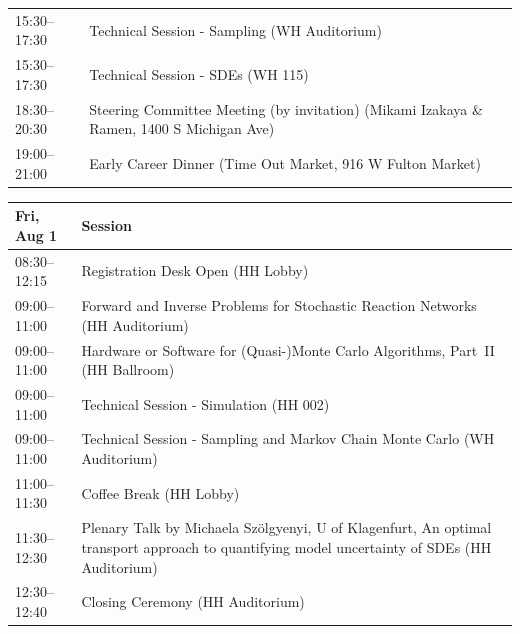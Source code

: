 \begin{table}
{\begin{tabularx}{\textwidth}{>{\hsize=0.32\hsize}X|>{\hsize=1.7\hsize}X}
\cellcolor{\SessionLightColor}15:30--17:30 & \cellcolor{\SessionLightColor}Technical Session - Sampling (WH Auditorium) \\
\cellcolor{\SessionLightColor}15:30--17:30 & \cellcolor{\SessionLightColor}Technical Session - SDEs (WH 115) \\
\cellcolor{\SessionTitleColor}18:30--20:30 & \cellcolor{\SessionTitleColor}Steering Committee Meeting (by invitation) (Mikami Izakaya \& Ramen, 1400 S Michigan Ave) \\
\cellcolor{\EmptyColor}19:00--21:00 & \cellcolor{\EmptyColor}Early Career Dinner (Time Out Market, 916 W Fulton Market) \\
\hline
\end{tabularx}
}
\end{table}

\begin{table}
{\footnotesize
\begin{tabularx}{\textwidth}{>{\hsize=0.32\hsize}X|>{\hsize=1.7\hsize}X}
\hline
\textbf{Fri, Aug 1} & \textbf{Session} \\
\hline
\cellcolor{\EmptyColor}08:30--12:15 & \cellcolor{\EmptyColor}Registration Desk Open (HH Lobby) \\
\cellcolor{\SessionTitleColor}09:00--11:00 & \cellcolor{\SessionTitleColor}Forward and Inverse Problems for Stochastic Reaction Networks (HH Auditorium) \\
\cellcolor{\SessionTitleColor}09:00--11:00 & \cellcolor{\SessionTitleColor}Hardware or Software for (Quasi-)Monte Carlo Algorithms, Part~II (HH Ballroom) \\
\cellcolor{\SessionLightColor}09:00--11:00 & \cellcolor{\SessionLightColor}Technical Session - Simulation (HH 002) \\
\cellcolor{\SessionLightColor}09:00--11:00 & \cellcolor{\SessionLightColor}Technical Session - Sampling and Markov Chain Monte Carlo (WH Auditorium) \\
\cellcolor{\EmptyColor}11:00--11:30 & \cellcolor{\EmptyColor}Coffee Break (HH Lobby) \\
\cellcolor{\PlenaryColor}11:30--12:30 & \cellcolor{\PlenaryColor}Plenary Talk by Michaela Sz\"olgyenyi, U of Klagenfurt, An optimal transport approach to quantifying model uncertainty of SDEs (HH Auditorium) \\
\cellcolor{\OpeningClosingColor}12:30--12:40 & \cellcolor{\OpeningClosingColor}Closing Ceremony (HH Auditorium) \\
\hline
\end{tabularx}
}
\end{table}

